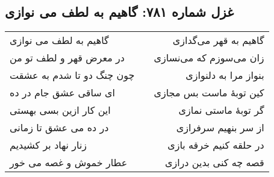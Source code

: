 \begin{center}
\section*{غزل شماره ۷۸۱: گاهیم به لطف می نوازی}
\label{sec:781}
\begin{longtable}{l p{0.5cm} r}
گاهیم به لطف می نوازی
&&
گاهیم به قهر می‌گدازی
\\
در معرض قهر و لطف تو من
&&
زان می‌سوزم که می‌نسازی
\\
چون چنگ دو تا شدم به عشقت
&&
بنواز مرا به دلنوازی
\\
ای ساقی عشق جام در ده
&&
کین توبهٔ ماست بس مجازی
\\
این کار ازین بسی بهستی
&&
گر توبهٔ ماستی نمازی
\\
در ده می عشق تا زمانی
&&
از سر بنهیم سرفرازی
\\
زنار نهاد بر کشیدیم
&&
در حلقه کنیم خرقه بازی
\\
عطار خموش و غصه می خور
&&
قصه چه کنی بدین درازی
\\
\end{longtable}
\end{center}
